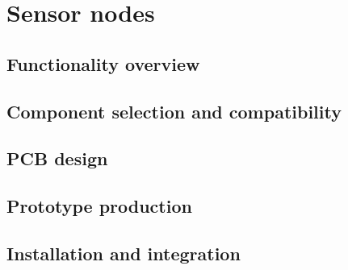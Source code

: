 \chapter{Sensor nodes}
\label{chap:nodes}

\section{Functionality overview}
\section{Component selection and compatibility}
\section{PCB design}
\section{Prototype production}
\section{Installation and integration}

